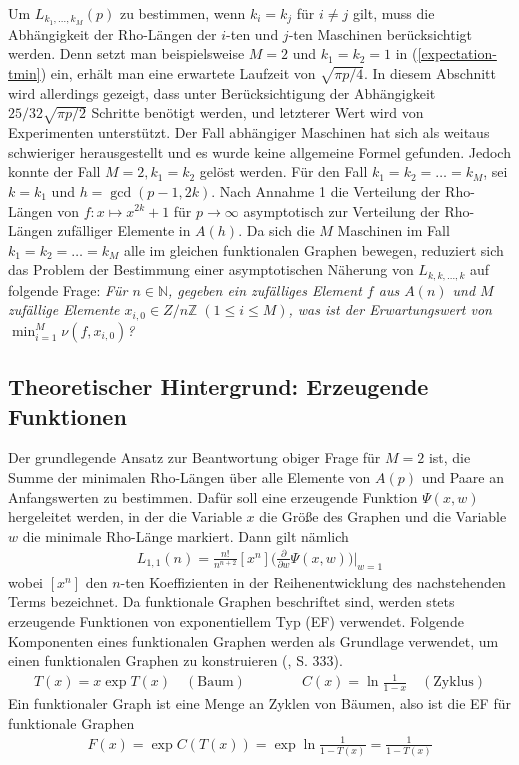 \documentclass[a4paper, 10pt, ngerman]{article}
\newcommand{\N}{\mathbb{N}}
\newcommand{\Z}{\mathbb{Z}}
\begin{document}
Um $L_{k_1, \dots, k_M}(p)$ zu bestimmen, wenn $k_i = k_j$ für $i \ne j$ gilt, muss die Abhängigkeit der Rho-Längen der $i$-ten und $j$-ten Maschinen berücksichtigt werden. Denn setzt man beispielsweise $M = 2$ und $k_1 = k_2 = 1$ in (\ref{expectation-tmin}) ein, erhält man eine erwartete Laufzeit von $\sqrt {\pi p / 4}$. In diesem Abschnitt wird allerdings gezeigt, dass unter Berücksichtigung der Abhängigkeit $25/32 \sqrt{\pi p / 2}$ Schritte benötigt werden, und letzterer Wert wird von Experimenten unterstützt. Der Fall abhängiger Maschinen hat sich als weitaus schwieriger herausgestellt und es wurde keine allgemeine Formel gefunden. Jedoch konnte der Fall $M = 2, k_1 = k_2$ gelöst werden. Für den Fall $k_1 = k_2 = \dots = k_M$, sei $k = k_1$ und $h = \gcd(p - 1, 2k)$. Nach Annahme 1 die Verteilung der Rho-Längen von $f : x \mapsto x^{2k} + 1$ für $p \to \infty$ asymptotisch zur Verteilung der Rho-Längen zufälliger Elemente in $A(h)$. Da sich die $M$ Maschinen im Fall $k_1 = k_2 = \dots = k_M$ alle im gleichen funktionalen Graphen bewegen, reduziert sich das Problem der Bestimmung einer asymptotischen Näherung von $L_{k, k, \dots, k}$ auf folgende Frage: \emph{Für $n \in \N$, gegeben ein zufälliges Element $f$ aus $A(n)$ und $M$ zufällige Elemente $x_{i, 0} \in Z/n\Z \; (1 \le i \le M)$, was ist der Erwartungswert von $\min_{i = 1}^M \nu(f, x_{i, 0})$?}

\subsection{Theoretischer Hintergrund: Erzeugende Funktionen}

Der grundlegende Ansatz zur Beantwortung obiger Frage für $M = 2$ ist, die Summe der minimalen Rho-Längen über alle Elemente von $A(p)$ und Paare an Anfangswerten zu bestimmen. Dafür soll eine erzeugende Funktion $\Psi(x, w)$ hergeleitet werden, in der die Variable $x$ die Größe des Graphen und die Variable $w$ die minimale Rho-Länge markiert. Dann gilt nämlich
\begin{align*}
    L_{1, 1}(n) = \frac {n!}{n^{n + 2}} [x^n] \Bigg (\frac {\partial} {\partial w} \Psi(x, w) \Bigg ) \Bigg \vert_{w = 1}
\end{align*}
wobei $[x^n]$ den $n$-ten Koeffizienten in der Reihenentwicklung des nachstehenden Terms bezeichnet. Da funktionale Graphen beschriftet sind, werden stets erzeugende Funktionen von exponentiellem Typ (EF) verwendet. Folgende Komponenten eines funktionalen Graphen werden als Grundlage verwendet, um einen funktionalen Graphen zu konstruieren (\cite{fo90}, S. 333).
\begin{align*}
    T(x) = x \exp T(x) \quad (\text{Baum}) \qquad\qquad C(x) = \ln \frac {1} {1 - x} \quad (\text{Zyklus})
\end{align*}
Ein funktionaler Graph ist eine Menge an Zyklen von Bäumen, also ist die EF für funktionale Graphen
\begin{align*}
    F(x) = \exp C(T(x)) = \exp \ln \frac 1 {1 - T(x)} = \frac 1 {1 - T(x)}
\end{align*}
\end{document}
